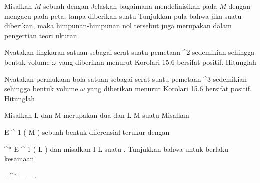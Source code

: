 {}
{

Misalkan $M$ sebuah
dengan
Jelaskan bagaimana mendefinisikan  pada $M$ dengan mengacu pada peta, tanpa diberikan suatu
Tunjukkan pula bahwa jika suatu
diberikan, maka himpunan-himpunan nol tersebut juga merupakan
dalam pengertian teori ukuran.

}
{} {}

{}
{

Nyatakan lingkaran satuan
 sebagai serat suatu pemetaan
\maabbdisp {} {\R^2} {\R
} {}
sedemikian sehingga bentuk volume $\omega$ yang diberikan menurut
Korolari 15.6
bersifat positif. Hitunglah

}
{} {}

{}
{

Nyatakan permukaan bola satuan
 sebagai serat suatu pemetaan
\maabbdisp {} {\R^3} {\R
} {}
sedemikian sehingga bentuk volume $\omega$ yang diberikan menurut
Korolari 15.6
bersifat positif. Hitunglah

}
{} {}

{}
{

Misalkan
\mathkor {} {L} {dan} {M} {}
merupakan dua
dan
\maabbdisp {\varphi} { L } { M
} {}
suatu
Misalkan

\mavergleichskette
{\vergleichskette
{ \omega
}
{ \in }{
{ \mathcal E }^{  1 } (  M   )
}
{  }{
}
{    }{
}
{   }{
}
}
{}{}{}
sebuah bentuk diferensial terukur dengan

\mavergleichskette
{\vergleichskette
{ \varphi^*\omega
}
{ \in }{
{ \mathcal E }^{  1 } (  L   )
}
{  }{
}
{    }{
}
{   }{
}
}
{}{}{}
dan misalkan
\maabbdisp {\gamma} { I } { L
} {}
suatu
 {} {.}
Tunjukkan bahwa untuk
berlaku kesamaan

\mavergleichskettedisp
{\vergleichskette
{ \int_\gamma \varphi^* \omega
}
{ =} { \int_{\varphi \circ \gamma} \omega
}
{ } {
}
{ } {
}
{ } {
}
}
{}{}{.}

}
{} {}

